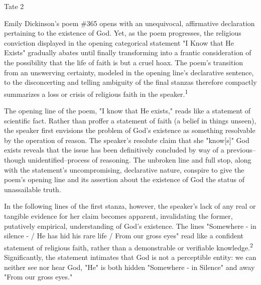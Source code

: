 \begin{tcolorbox}[enhanced,width=4.2in,left=.3in, right=.3in,
   drop fuzzy shadow southeast,
    boxrule=0.4pt,sharp corners,colframe=black!80!black,colback=white!10]

\medskip

{\scriptsize \begin{flushright} Tate 2 \end{flushright}
\begin{doublespacing}


\hspace{1.4em} Emily Dickinson's poem \#365 opens with an unequivocal, affirmative declaration pertaining to the existence of God.  Yet, as the poem progresses, the religious conviction displayed in the opening categorical statement "I Know that He Exists" gradually abates until finally transforming into a frantic consideration of the possibility that the life of faith is but a cruel hoax.  The poem's transition from an unswerving certainty, modeled in the opening line's declarative sentence, to the disconcerting and telling ambiguity of the final stanzas therefore compactly summarizes a loss or crisis of religious faith in the speaker.\textsuperscript{1}  
  
\hspace{1.4em} The opening line of the poem, "I know that He exists," reads like a statement of scientific fact.  Rather than proffer a statement of faith (a belief in things unseen), the speaker first envisions the problem of God's existence as something resolvable by the operation of reason.  The speaker's resolute claim that she "know[s]" God exists reveals that the issue has been definitively concluded by way of a previous--though unidentified--process of  reasoning.  The unbroken line and full stop, along with the statement's uncompromising, declarative nature, conspire to give the poem's opening line and its assertion about the existence of God the status of unassailable truth.  

\hspace{1.4em}In the following lines of the first stanza, however, the speaker's lack of any real or tangible evidence for her claim becomes apparent, invalidating the former, putatively empirical, understanding of God's existence. The lines "Somewhere - in silence - / He has hid his rare life / From our gross eyes" read like a confident statement of religious faith, rather than a demonstrable or verifiable knowledge.\textsuperscript{2}  Significantly, the statement intimates that God is not a perceptible entity: we can neither see nor hear God, "He" is both hidden "Somewhere - in Silence" and away "From our gross eyes." 


\end{doublespacing}}
\vspace{.33in}


\end{tcolorbox}


